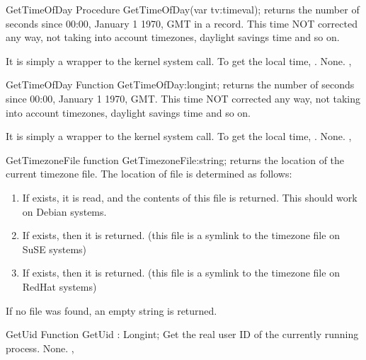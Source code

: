 
\begin{procedure}{GetTimeOfDay}
\Declaration
Procedure GetTimeOfDay(var tv:timeval);
\Description
{} returns the number of seconds since 00:00, January 1 
1970, GMT in a  record. This time NOT corrected any way, 
not taking into account timezones, daylight savings time and so on.

It is simply a wrapper to the kernel system call. To get the local time,
.
\Errors
None.
\SeeAlso
{}, 
\end{procedure}

\begin{function}{GetTimeOfDay}
\Declaration
Function GetTimeOfDay:longint;
\Description
{} returns the number of seconds since 00:00, January 1
1970, GMT. This time NOT corrected any way, not taking into account
timezones, daylight savings time and so on.

It is simply a wrapper to the kernel system call. To get the local time,
.
\Errors
None.
\SeeAlso
{}, 
\end{function}

\begin{function}{GetTimezoneFile}
\Declaration
function GetTimezoneFile:string;
\Description
{} returns the location of the current timezone file.
The location of file is determined as follows:
\begin{enumerate}
\item If  exists, it is read, and the contents of this
file is returned. This should work on Debian systems.
\item If  exists, then it is returned.
(this file is a symlink to the timezone file on SuSE systems)
\item If  exists, then it is returned. 
(this file is a symlink to the timezone file on RedHat systems)
\end{enumerate}
\Errors
If no file was found, an empty string is returned.
\SeeAlso
{}
\end{function}

\begin{function}{GetUid}
\Declaration
Function GetUid  : Longint;
\Description
 Get the real user ID of the currently running process.
\Errors
None.
\SeeAlso
{},  
\end{function}

